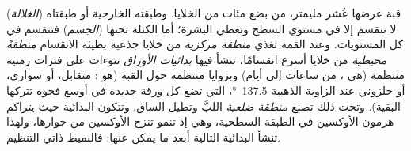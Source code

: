 \begin{proposition}\label{prop:b2:plant-meristems:sam}
 قبة عرضها عُشر مليمتر، من بضع مئات
من الخلايا. وطبقته الخارجية أو طبقتاه (\emph{الغلالة}) لا تنقسم إلا
في مستوي السطح وتعطي البشرة؛ أما الكتلة تحتها
(\emph{الجسم}) فتنقسم في كل المستويات. وعند القمة تغذي
\emph{منطقة مركزية} من خلايا جذعية بطيئة الانقسام
\emph{منطقةً محيطية} من خلايا أسرع انقسامًا، تنشأ فيها \emph{بدائيات
الأوراق} نتوءات على فترات زمنية منتظمة (هي
\emph{}، من ساعات إلى أيام) وبزوايا منتظمة حول
القبة (هو \emph{}: متقابل، أو سواري، أو حلزوني عند
الزاوية الذهبية \qty{137.5}{\degree}، التي تضع كل ورقة جديدة في
أوسع فجوة تتركها البقية). وتحت ذلك تصنع \emph{منطقة ضلعية}
اللبَّ وتطيل الساق. وتتكون البدائية حيث يتراكم
هرمون الأوكسين في الطبقة السطحية، وهي إذ تنمو تنزح
الأوكسين من جوارها، ولهذا تنشأ البدائية التالية
أبعد ما يمكن عنها: فالنميط ذاتي التنظيم.
\end{proposition}

